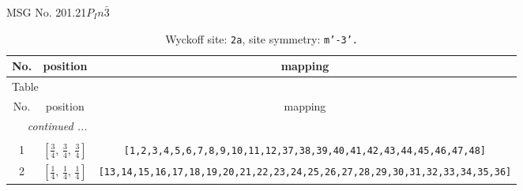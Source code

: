 \documentclass[fleqn,8pt]{jsarticle}
\begin{document}
\setcounter{MaxMatrixCols}{32}

\renewcommand{\tablename}{Table~}
\renewcommand{\figurename}{Figure~}
\begin{center}
\LARGE
MSG No. 201.21\quad$P_{I}n\bar{3}$
\end{center}
\renewcommand{\arraystretch}{1.2}
\begin{longtable}{ccc}
\caption{Wyckoff site: {\tt 2a}, site symmetry: {\tt m'-3'.}}
 \\
 \hline \hline
No. & position & mapping \\ \hline \endfirsthead

\multicolumn{2}{l}{\tablename\ \thetable{}} \\
 \hline \hline
No. & position & mapping \\ \hline \endhead

 \hline \hline
\multicolumn{2}{r}{\footnotesize\it continued ...} \\ \endfoot

 \hline \hline
\multicolumn{2}{r}{} \\ \endlastfoot

1 & $\left[ \frac{3}{4},\, \frac{3}{4},\, \frac{3}{4} \right]$ & {\tt [1,2,3,4,5,6,7,8,9,10,11,12,37,38,39,40,41,42,43,44,45,46,47,48]} \\ \hline
2 & $\left[ \frac{1}{4},\, \frac{1}{4},\, \frac{1}{4} \right]$ & {\tt [13,14,15,16,17,18,19,20,21,22,23,24,25,26,27,28,29,30,31,32,33,34,35,36]} \\
\end{longtable}
\renewcommand{\arraystretch}{1.2}
\end{document}
